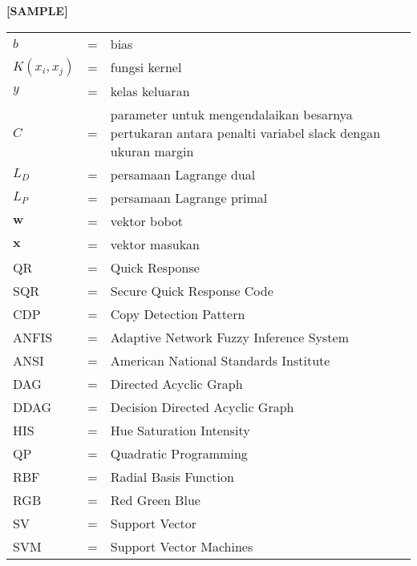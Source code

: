 \begin{center}
	\textbf{[SAMPLE]}
\end{center}

\begin{tabular}{llp{3in}}
	$b$	& \hspace{1.5cm} = &	bias \\
	$K(x_i,x_j)$ & \hspace{1.5cm} = & fungsi kernel \\ 
	$y$	& \hspace{1.5cm} = & kelas keluaran \\
	$C$	&  \hspace{1.5cm} = & parameter untuk mengendalaikan besarnya pertukaran antara penalti variabel slack dengan ukuran margin \\
	$L_D$	& \hspace{1.5cm} = & persamaan Lagrange dual \\
	$L_P$	& \hspace{1.5cm}  = &	persamaan Lagrange primal \\
	$\textbf{w}$ &  \hspace{1.5cm} = &	vektor bobot \\
	$\textbf{x}$ &  \hspace{1.5cm} = &	vektor masukan\\
		QR &  \hspace{1.5cm} = &	Quick Response\\
		SQR &  \hspace{1.5cm} = &	Secure Quick Response Code\\
		CDP &  \hspace{1.5cm} = &	Copy Detection Pattern\\
		ANFIS &  \hspace{1.5cm} = &	Adaptive Network Fuzzy Inference System\\
		ANSI	&  \hspace{1.5cm} = &	American National Standards Institute\\
		DAG	&  \hspace{1.5cm} = & Directed Acyclic Graph\\
		DDAG &  \hspace{1.5cm} = & Decision Directed Acyclic Graph\\
		HIS	&  \hspace{1.5cm} = & Hue Saturation Intensity\\
		QP	&  \hspace{1.5cm} = & Quadratic Programming\\
		RBF	&  \hspace{1.5cm} = &	Radial Basis Function\\
		RGB	&  \hspace{1.5cm} = & Red Green Blue\\
		SV	&  \hspace{1.5cm} = &	Support Vector\\
		SVM	&  \hspace{1.5cm} = & Support Vector Machines\\
		
\end{tabular}
